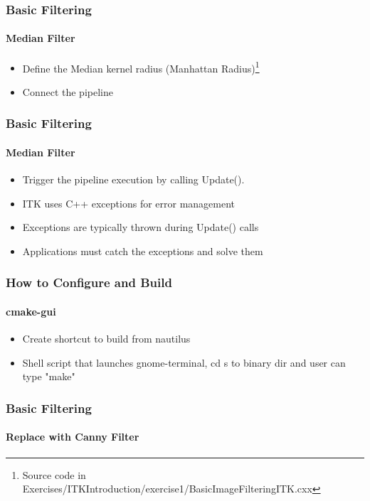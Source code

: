 {
\begin{frame}[fragile]
\frametitle{Basic Filtering}
\framesubtitle{Median Filter}
\begin{itemize}
\item Define the Median kernel radius (Manhattan Radius)\footnote{Source code in Exercises/ITKIntroduction/exercise1/BasicImageFilteringITK.cxx}
\end{itemize}
\begin{center}

\end{center}
\pause
\begin{itemize}
\item Connect the pipeline
\end{itemize}
\begin{center}

\end{center}
\end{frame}
}

{
\begin{frame}[fragile]
\frametitle{Basic Filtering}
\framesubtitle{Median Filter}
\begin{itemize}
\item Trigger the pipeline execution by calling Update().
\end{itemize}
\begin{center}

\end{center}
\pause
\begin{itemize}
\item ITK uses C++ exceptions for error management
\item Exceptions are typically thrown during Update() calls
\item Applications must catch the exceptions and solve them
\end{itemize}
\end{frame}
}


\begin{frame}
\frametitle{How to Configure and Build}
\framesubtitle{cmake-gui}
\begin{itemize}
\item Create shortcut to build from nautilus
\item Shell script that launches gnome-terminal, cd s to binary dir and user can type "make"
\end{itemize}
\end{frame}


\begin{frame}
\frametitle{Basic Filtering}
\framesubtitle{Replace with Canny Filter}
\begin{center}

\end{center}
\end{frame}
